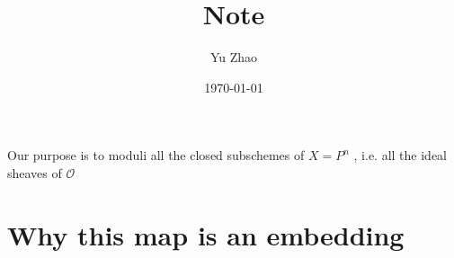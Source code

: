 \documentclass[11pt]{article}
\author{Yu Zhao}
\date{\today}
\title{Note}
\begin{document}
\maketitle
\setcounter{secnumdepth}{-1}
Our purpose is to moduli all the closed subschemes of $X=P^{n}$ , i.e. all the ideal sheaves of $\mathcal{O}$  
\section{Why this map is an embedding}
\label{sec-1}
\end{document}
